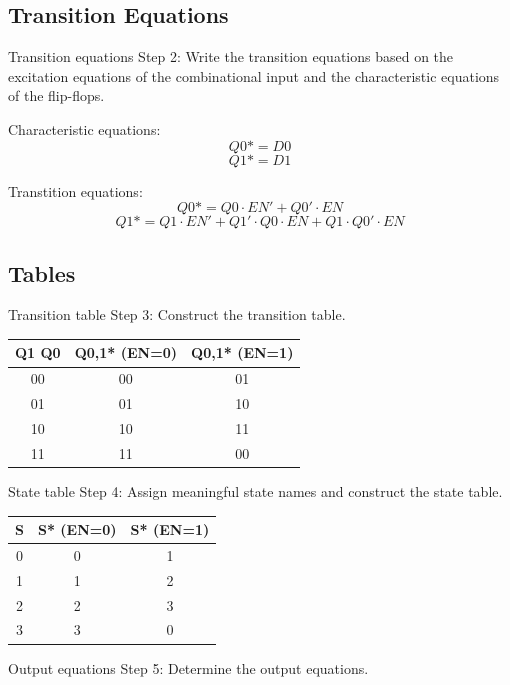 \subsection{Transition Equations}

\begin{frame}[t]{Transition equations}
  Step 2: Write the transition equations based on the excitation equations of the combinational input and the characteristic equations of the flip-flops.
\end{frame}

Characteristic equations:
$$Q0* = D0$$
$$Q1* = D1$$

Transtition equations:
$$Q0* = Q0 \cdot EN' + Q0' \cdot EN$$
$$Q1* = Q1 \cdot EN' + Q1' \cdot Q0 \cdot EN + Q1 \cdot Q0' \cdot EN$$

\subsection{Tables}

\begin{frame}[t]{Transition table}
  Step 3: Construct the transition table.
\end{frame}

\begin{tabular}{c|cc}
  Q1 Q0 & Q{0,1}* (EN=0) & Q{0,1}* (EN=1) \\
  \hline
  00 & 00 & 01 \\
  01 & 01 & 10 \\
  10 & 10 & 11 \\
  11 & 11 & 00 \\
\end{tabular}

\begin{frame}[t]{State table}
  Step 4: Assign meaningful state names and construct the state table.
\end{frame}

\begin{tabular}{c|cc}
  S & S* (EN=0) & S* (EN=1) \\
  \hline
  0 & 0 & 1 \\
  1 & 1 & 2 \\
  2 & 2 & 3 \\
  3 & 3 & 0 \\
\end{tabular}

\begin{frame}[t]{Output equations}
  Step 5: Determine the output equations.
\end{frame}

